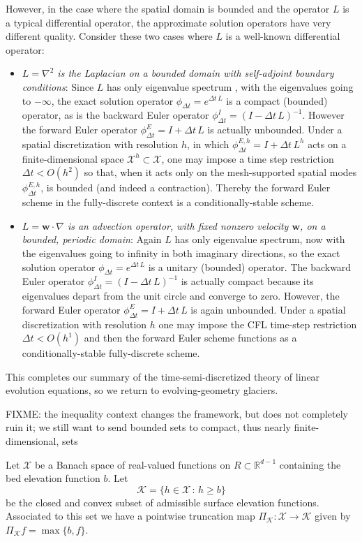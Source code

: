 \documentclass[letterpaper,final,12pt,reqno]{amsart}
\newcommand{\RR}{\mathbb{R}}
\newcommand{\grad}{\nabla}
\newcommand{\bw}{\mathbf{w}}
\newcommand{\PiK}{\Pi_{\mathcal{K}}}
\begin{document}
However, in the case where the spatial domain is bounded and the operator $L$ is a typical differential operator, the approximate solution operators have very different quality.  Consider these two cases where $L$ is a well-known differential operator:
\begin{itemize}
\item \emph{$L=\grad^2$ is the Laplacian on a bounded domain with self-adjoint boundary conditions}:  Since $L$ has only eigenvalue spectrum \cite{Evans2010}, with the eigenvalues going to $-\infty$, the exact solution operator $\phi_{\Delta t} = e^{\Delta t\,L}$ is a compact (bounded) operator, as is the backward Euler operator $\phi^I_{\Delta t} = (I - \Delta t\,L)^{-1}$.  However the forward Euler operator $\phi^E_{\Delta t} = I + \Delta t\,L$ is actually unbounded.  Under a spatial discretization with resolution $h$, in which $\phi^{E,h}_{\Delta t} = I + \Delta t\,L^h$ acts on a finite-dimensional space $\mathcal{X}^h\subset \mathcal{X}$, one may impose a time step restriction $\Delta t < O(h^2)$ so that, when it acts only on the mesh-supported spatial modes $\phi^{E,h}_{\Delta t}$, is bounded (and indeed a contraction).  Thereby the forward Euler scheme in the fully-discrete context is a conditionally-stable scheme.
\item \emph{$L=\bw \cdot \grad$ is an advection operator, with fixed nonzero velocity $\bw$, on a bounded, periodic domain}:  Again $L$ has only eigenvalue spectrum, now with the eigenvalues going to infinity in both imaginary directions, so the exact solution operator $\phi_{\Delta t} = e^{\Delta t\,L}$ is a unitary (bounded) operator.  The backward Euler operator $\phi^I_{\Delta t} = (I - \Delta t\,L)^{-1}$ is actually compact because its eigenvalues depart from the unit circle and converge to zero.  However, the forward Euler operator $\phi^E_{\Delta t} = I + \Delta t\,L$ is again unbounded.  Under a spatial discretization with resolution $h$ one may impose the CFL time-step restriction $\Delta t < O(h^1)$ \cite{LeVeque2007} and then the forward Euler scheme functions as a conditionally-stable fully-discrete scheme.
\end{itemize}
This completes our summary of the time-semi-discretized theory of linear evolution equations, so we return to evolving-geometry glaciers.

FIXME: the inequality context changes the framework, but does not completely ruin it; we still want to send bounded sets to compact, thus nearly finite-dimensional, sets

Let $\mathcal{X}$ be a Banach space of real-valued functions on $R \subset \RR^{d-1}$ containing the bed elevation function $b$.  Let
    $$\mathcal{K} = \{h \in \mathcal{X}\,:\,h \ge b\}$$
be the closed and convex subset of admissible surface elevation functions.  Associated to this set we have a pointwise truncation map $\PiK : \mathcal{X} \to \mathcal{K}$ given by $\PiK f = \max\{b,f\}$.
\end{document}
